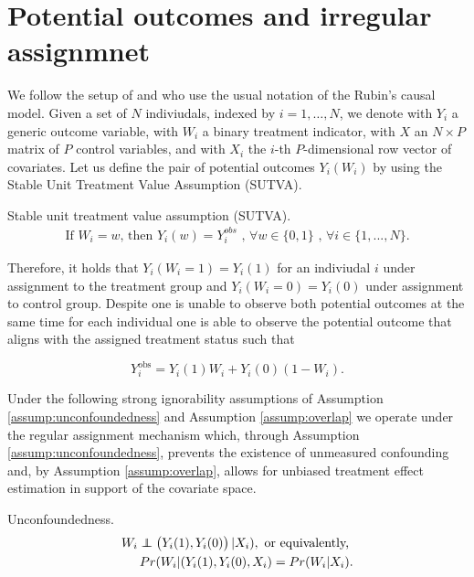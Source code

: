 \chapter{Potential outcomes and irregular assignmnet}

We follow the setup of \cite{bargagli_stoffi_causal_2020} and \cite{bargagli-stoffi_heterogeneous_2022} who use the usual notation of the Rubin's causal model. Given a set of $N$ indiviudals, indexed by $i = 1, \ldots, N$, we denote with $Y_i$ a generic outcome variable, with $W_i$ a binary treatment indicator, with $X$ an $N \times P$ matrix of $P$ control variables, and with $X_i$ the $i$-th $P$-dimensional row vector of covariates.
Let us define the pair of potential outcomes $Y_i(W_i)$ by using the Stable Unit Treatment Value Assumption (SUTVA). 
\begin{assump}{Stable unit treatment value assumption (SUTVA).}
   \label{assump:SUTVA} \\
   \begin{align*}
   \label{SUTVA}
   \text{If } W_i = w \text{, then } Y_i(w) = Y_i^{obs} \text{ , } \forall w \in \{0, 1 \} \text{ , } \forall i \in \{1, ..., N \}. 
   \end{align*}
\end{assump}
Therefore, it holds that $Y_i(W_i = 1) = Y_i(1)$ for an indiviudal $i$ under assignment to the treatment group and $Y_i(W_i = 0) = Y_i(0)$ under assignment to control group.
Despite one is unable to observe both potential outcomes at the same time for each individual one is able to observe the potential outcome that aligns with the assigned treatment status such that

\[
Y_i^{\text{obs}} = Y_i(1)W_i + Y_i(0)(1 - W_i).
\]

Under the following strong ignorability assumptions of Assumption \ref{assump:unconfoundedness} and Assumption \ref{assump:overlap} we operate under the regular assignment mechanism which, through Assumption \ref{assump:unconfoundedness}, prevents the existence of unmeasured confounding and, by Assumption \ref{assump:overlap}, allows for unbiased treatment effect estimation in support of the covariate space. 

\begin{assump}{Unconfoundedness.}
   \label{assump:unconfoundedness} \\
   \begin{align*}
   W_i \perp\!\!\!\!\perp \left(Y_i(1), Y_i(0)\right) |X_i), \text{ or equivalently, } \\
   Pr(W_i | (Y_i(1), Y_i(0), X_i) = Pr(W_i | X_i).   
   \end{align*}
\end{assump}

